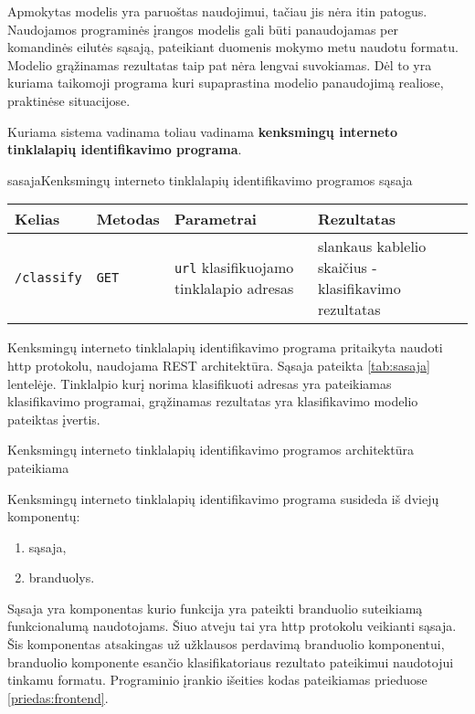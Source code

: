 
Apmokytas modelis yra paruoštas naudojimui, tačiau jis nėra itin patogus. Naudojamos programinės įrangos modelis gali
būti panaudojamas per komandinės eilutės sąsają, pateikiant duomenis mokymo metu naudotu formatu. Modelio grąžinamas
rezultatas taip pat nėra lengvai suvokiamas. Dėl to yra kuriama taikomoji programa kuri supaprastina modelio
panaudojimą realiose, praktinėse situacijose.

Kuriama sistema vadinama toliau vadinama \textbf{kenksmingų interneto tinklalapių identifikavimo programa}.

\begin{ktutable}{sasaja}{Kenksmingų interneto tinklalapių identifikavimo programos sąsaja}
    \begin{tabular}{|l|l|p{5cm}|p{5cm}|}
    \hline
        Kelias & Metodas & Parametrai & Rezultatas \\ \hline
        \texttt{/classify} & \texttt{GET} & \texttt{url} klasifikuojamo tinklalapio adresas & slankaus kablelio skaičius - klasifikavimo rezultatas \\ \hline
    \end{tabular}
\end{ktutable}

Kenksmingų interneto tinklalapių identifikavimo programa pritaikyta naudoti http protokolu, naudojama REST architektūra. Sąsaja pateikta \vref{tab:sasaja}
lentelėje. Tinklalpio kurį norima klasifikuoti adresas yra pateikiamas klasifikavimo programai, grąžinamas
rezultatas yra klasifikavimo modelio pateiktas įvertis.

Kenksmingų interneto tinklalapių identifikavimo programos architektūra pateikiama 


Kenksmingų interneto tinklalapių identifikavimo programa susideda iš dviejų komponentų:
\begin{enumerate}
\item sąsaja,
\item branduolys.
\end{enumerate}
Sąsaja yra komponentas kurio funkcija yra pateikti branduolio suteikiamą funkcionalumą naudotojams. Šiuo atveju
tai yra http protokolu veikianti sąsaja. Šis komponentas atsakingas už užklausos perdavimą branduolio komponentui,
branduolio komponente esančio klasifikatoriaus rezultato pateikimui naudotojui tinkamu formatu. Programinio
įrankio išeities kodas pateikiamas prieduose \vref{priedas:frontend}.

